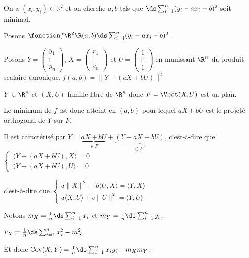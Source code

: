 \begin{exemple}
    On a $(x_i, y_i) \in \mathbb R^2$ et on cherche $a, b$ tels que 
    $\ds \sum_{i = 1}^n (y_i - ax_i - b)^2$ soit minimal.

    Posons $\fonction f {\R^2}{\R}{(a, b)}{\ds \sum_{i = 1}^n (y_i - ax_i - b)^2}$.

    Posons $Y = \begin{pmatrix}
y_1 \\
\vdots \\
y_n
\end{pmatrix}$, $X = \begin{pmatrix}
    x_1 \\
    \vdots \\
    x_n
    \end{pmatrix}$ et $U = \begin{pmatrix}
    1 \\
    \vdots \\
    1
    \end{pmatrix}$ en munissant $\R^n$ du produit scalaire canonique, 
    $f(a, b) = \| Y - (a X + bU) \|^2$ 

    $Y \in \R^n$ et $(X, U)$ famille libre de $\R^n$ donc $F = \Vect(X, U)$ est un plan. 

    Le minimum de $f$ est donc atteint en $(a, b)$ pour lequel $aX + bU$ est le projeté
    orthogonal de $Y$ sur $F$. 

    Il est caractérisé par $Y = \underbrace{aX + bU}_{\in F} + \underbrace{(Y - aX - bU)}_{\in F^\perp}$, 
    c'est-à-dire que 
    $\begin{cases}
        \langle Y - (aX + bU), X \rangle = 0 \\
        \langle Y - (aX + bU), U \rangle = 0
    \end{cases}$
    
    c'est-à-dire que $\begin{cases}
        a \|X\|^2 + b \langle U, X \rangle = \langle Y, X \rangle \\
        a \langle X, U \rangle + b \|U\|^2 = \langle Y, U \rangle
    \end{cases}$

    Notons $m_X = \frac 1 n \ds \sum_{i = 1}^n x_i$ et $m_Y = \frac 1 n \ds \sum_{i = 1}^n y_i$.

    $v_X = \frac 1 n \ds \sum_{i = 1 }^{n } x_i^2 - m_X^2$

    Et donc $\operatorname{Cov} (X, Y) = \frac 1 n \ds \sum_{i = 1}^n x_i y_i - m_X m_Y$.


\end{exemple}
